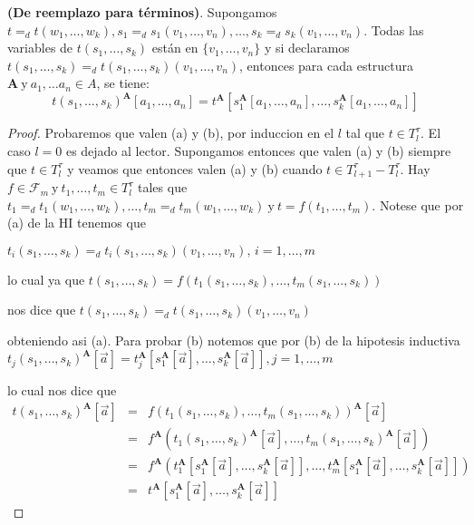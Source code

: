   \begin{lemma} \label{lemma_60}
    \PN \textbf{(De reemplazo para términos)}. Supongamos $t =_{d} t(w_{1}, \dotsc, w_{k}), s_{1} =_{d} s_{1}(v_{1},
    \dotsc, v_{n}), \dotsc, s_{k} =_{d} s_{k}(v_{1}, \dotsc, v_{n})$. Todas las variables de $t(s_{1}, \dotsc, s_{k})$
    están en $\{v_{1}, \dotsc, v_{n}\}$ y si declaramos $t(s_{1}, \dotsc, s_{k}) =_{d} t(s_{1}, \dotsc, s_{k})(v_{1},
    \dotsc, v_{n})$, entonces para cada estructura $\mathbf{A} \ \text{y} \ a_{1}, \dotsc a_{n} \in A$, se tiene:
    \[
      t(s_{1}, \dotsc, s_{k})^{\mathbf{A}}[a_{1}, \dotsc, a_{n}] = t^{\mathbf{A}}[s_{1}^{\mathbf{A}}[a_{1}, \dotsc,
      a_{n}], \dotsc, s_{k}^{\mathbf{A}}[a_{1}, \dotsc, a_{n}]]
    \]
  \end{lemma}
  \begin{proof}
    Probaremos que valen (a) y (b), por induccion en el $l$ tal que $t\in T_{l}^{\tau }.$ El caso $l=0$ es dejado al lector. Supongamos entonces que valen (a) y (b) siempre que $t\in T_{l}^{\tau }$ y veamos que entonces valen (a) y (b) cuando $t\in T_{l+1}^{\tau }-T_{l}^{\tau }$. Hay $f\in \mathcal{F} _{m} \ \text{y} \ t_{1}, \dotsc, t_{m}\in T_{l}^{\tau }$ tales que $ t_{1}=_{d}t_{1}(w_{1}, \dotsc, w_{k}), \dotsc, t_{m}=_{d}t_{m}(w_{1}, \dotsc, w_{k}) \ \text{y} \  t=f(t_{1}, \dotsc, t_{m})$. Notese que por (a) de la HI tenemos que

    $\displaystyle t_{i}(s_{1}, \dotsc, s_{k})=_{d}t_{i}(s_{1}, \dotsc, s_{k})(v_{1}, \dotsc, v_{n})\text{, } i=1, \dotsc, m $

    lo cual ya que
    $\displaystyle t(s_{1}, \dotsc, s_{k})=f(t_{1}(s_{1}, \dotsc, s_{k}), \dotsc, t_{m}(s_{1}, \dotsc, s_{k})) $

    nos dice que
    $\displaystyle t(s_{1}, \dotsc, s_{k})=_{d}t(s_{1}, \dotsc, s_{k})(v_{1}, \dotsc, v_{n}) $

    obteniendo asi (a). Para probar (b) notemos que por (b) de la hipotesis inductiva
    $\displaystyle t_{j}(s_{1}, \dotsc, s_{k})^{\mathbf{A}}[\vec{a}]=t_{j}^{\mathbf{A}}[s_{1}^{ \mathbf{A}}[\vec{a}], \dotsc, s_{k}^{\mathbf{A}}[\vec{a}]],j=1, \dotsc, m $

    lo cual nos dice que
    $\displaystyle \begin{array}{ccl} t(s_{1}, \dotsc, s_{k})^{\mathbf{A}}[\vec{a}] & = & f(t_{1}(s_{1}, \dotsc, s_{k}), \dotsc, t_{m}(s_{1}, \dotsc, s_{k}))^{\mathbf{A}}[\vec{a}] \\ & = & f^{\mathbf{A}}(t_{1}(s_{1}, \dotsc, s_{k})^{\mathbf{A}}[\vec{a} ], \dotsc, t_{m}(s_{1}, \dotsc, s_{k})^{\mathbf{A}}[\vec{a}]) \\ & = & f^{\mathbf{A}}(t_{1}^{\mathbf{A}}[s_{1}^{\mathbf{A}}[\vec{a} ], \dotsc, s_{k}^{\mathbf{A}}[\vec{a}]], \dotsc, t_{m}^{\mathbf{A}}[s_{1}^{\mathbf{A}}[ \vec{a}], \dotsc, s_{k}^{\mathbf{A}}[\vec{a}]]) \\ & = & t^{\mathbf{A}}[s_{1}^{\mathbf{A}}[\vec{a}], \dotsc, s_{k}^{\mathbf{A}}[\vec{ a}]] \end{array} $
  \end{proof}

